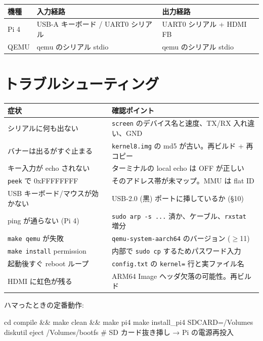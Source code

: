 \documentclass[a4paper,11pt]{ltjsarticle}
\begin{document}
\begin{center}\footnotesize
\begin{tabular}{@{}l l l@{}}
\toprule
\textbf{機種} & \textbf{入力経路} & \textbf{出力経路}\\
\midrule
Pi 4  & USB-A キーボード / UART0 シリアル & UART0 シリアル + HDMI FB\\
QEMU  & qemu のシリアル stdio          & qemu のシリアル stdio\\
\bottomrule
\end{tabular}
\end{center}

\section{トラブルシューティング}
\begin{center}\footnotesize
\begin{tabular}{@{}p{5.0cm} p{8.4cm}@{}}
\toprule
\textbf{症状} & \textbf{確認ポイント}\\
\midrule
シリアルに何も出ない            & \verb|screen| のデバイス名と速度、TX/RX 入れ違い、GND\\
バナーは出るがすぐ止まる        & \verb|kernel8.img| の md5 が古い。再ビルド + 再コピー\\
キー入力が echo されない        & ターミナルの local echo は OFF が正しい\\
\verb|peek| で 0xFFFFFFFF        & そのアドレス帯が未マップ。MMU は flat ID\\
USB キーボード/マウスが効かない  & USB-2.0 (黒) ポートに挿しているか (§10)\\
ping が通らない (Pi 4)          & \verb|sudo arp -s ...| 済か、ケーブル、\verb|rxstat| 増分\\
\verb|make qemu| が失敗          & \verb|qemu-system-aarch64| のバージョン ($\geq$11)\\
\verb|make install| permission   & 内部で \verb|sudo cp| するためパスワード入力\\
起動後すぐ reboot ループ        & \verb|config.txt| の \verb|kernel=| 行と実ファイル名\\
HDMI に虹色が残る               & ARM64 Image ヘッダ欠落の可能性。再ビルド\\
\bottomrule
\end{tabular}
\end{center}
ハマったときの定番動作:
\begin{code}
cd compile && make clean && make pi4
make install_pi4 SDCARD=/Volumes
diskutil eject /Volumes/bootfs
# SD カード抜き挿し → Pi の電源再投入
\end{code}
\end{document}
